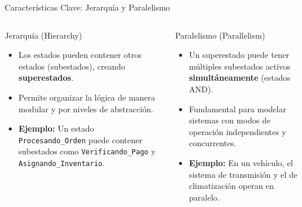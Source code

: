 \documentclass[aspectratio=169,xcolor=dvipsnames]{beamer}
\begin{document}

\begin{frame}{Características Clave: Jerarquía y Paralelismo}
    \begin{columns}[t]
            \begin{block}{Jerarquía (Hierarchy)}
                \begin{itemize}
                    \item Los estados pueden contener otros estados (subestados), creando \textbf{superestados}.
                    \item Permite organizar la lógica de manera modular y por niveles de abstracción.
                    \item \textbf{Ejemplo:} Un estado \texttt{Procesando\_Orden} puede contener subestados como \texttt{Verificando\_Pago} y \texttt{Asignando\_Inventario}.
                \end{itemize}
            \end{block}

            \begin{alertblock}{Paralelismo (Parallelism)}
                 \begin{itemize}
                    \item Un superestado puede tener múltiples subestados activos \textbf{simultáneamente} (estados AND).
                    \item Fundamental para modelar sistemas con modos de operación independientes y concurrentes.
                    \item \textbf{Ejemplo:} En un vehículo, el sistema de transmisión y el de climatización operan en paralelo.
                \end{itemize}
            \end{alertblock}
    \end{columns}
\end{frame}

\end{document}
